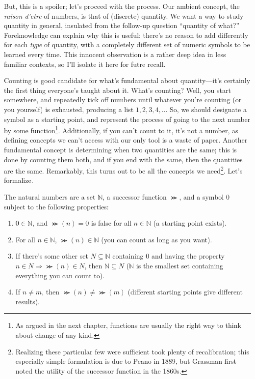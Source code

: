 But, this is a spoiler; let's proceed with the process.
Our ambient concept, the \textit{raison d'etre} of numbers, is that of (discrete) quantity.
We want a way to study quantity in general, insulated from the follow-up question ``quantity of what?''
Foreknowledge can explain why this is useful: there's no reason to add differently for each \textit{type} of quantity,
with a completely different set of numeric symbols to be learned every time.
This innocent observation is a rather deep idea in less familiar contexts, so I'll isolate it here for futre recall.
\begin{philosophy}
  \label{phil:suppress}
\end{philosophy}
Counting is good candidate for what's fundamental about quantity---it's certainly the first thing everyone's taught about it.
What's counting?
Well, you start somewhere, and repeatedly tick off numbers until whatever you're counting (or you yourself) is exhausted,
producing a list $1, 2, 3, 4, \ldots$
So, we should designate a symbol as a starting point, and represent the process of going to the next number by some function\footnote
{
  As argued in the next chapter, functions are usually the right way to think about change of any kind.
}.
Additionally, if you can't count to it, it's not a number, as defining concepts we can't access with our only tool is a waste of paper.
Another fundamental concept is determining when two quantities are the same; this is done by counting them both, and if you end with the same,
then the quantities are the same.
Remarkably, this turns out to be all the concepts we need\footnote
{
  Realizing these particular few were sufficient took plenty of recalibration; this especially simple formulation is due to Peano in 1889,
  but Grassman first noted the utility of the successor function in the 1860s.
}.
Let's formalize.
\begin{definition}
  The natural numbers are a set $\mathbb{N}$, a successor function $\Succ$, and a symbol $0$ subject to the following properties:
  \begin{enumerate}
  \item $0 \in \mathbb{N}$, and $\Succ(n) = 0$ is false for all $n \in \mathbb{N}$ (a starting point exists).
  \item For all $n \in \mathbb{N}$, $\Succ(n) \in \mathbb{N}$ (you can count as long as you want).
  \item If there's some other set $N \subseteq \mathbb{N}$ containing 0 and having the property $n \in N \Rightarrow \Succ(n) \in N$,
    then $\mathbb{N} \subseteq N$ ($\mathbb{N}$ is the smallest set containing everything you can count to).
  \item If $n \neq m$, then $\Succ(n) \neq \Succ(m)$ (different starting points give different results). %
  \end{enumerate}
\end{definition}

